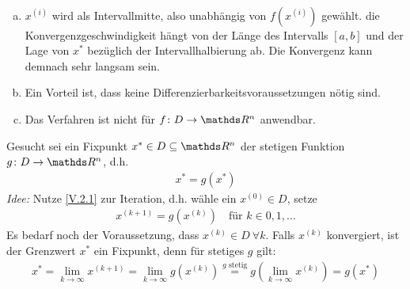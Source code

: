 \begin{Beme}~
  \begin{enumerate}[a)]
  \item $x^{(i)} $ wird als Intervallmitte, also unabhängig von $f(x^{(i)})$
    gewählt. die Konvergenzgeschwindigkeit hängt 
    von der Länge des Intervalls $[a,b]$
    und der Lage von $x^{*}$ bezüglich der Intervallhalbierung ab.
    Die Konvergenz kann demnach sehr langsam sein.
  \item Ein Vorteil ist, dass keine Differenzierbarkeitsvoraussetzungen nötig sind.
  \item Das Verfahren ist nicht für $f\colon D\to \R^n$ anwendbar.
  \end{enumerate}
\end{Beme}

Gesucht sei ein Fixpunkt $x^{*}\in D\subseteq \R^n$ der stetigen Funktion
$g\colon D\to\R^n$, d.h.
\begin{gather}
  x^{*} = g(x^{*}) \label{V.2.1}
\end{gather}
\textit{Idee:}
Nutze \eqref{V.2.1} zur Iteration, d.h. wähle ein $x^{(0)}\in D$, setze 
\begin{gather}
  x^{(k+1)} = g(x^{(k)})  \quad \text{für } k\in 0, 1, \dotsc
  \label{V.2.2}
\end{gather}
Es bedarf noch der Voraussetzung, dass $x^{(k)}\in D~ \forall k$.
Falls $x^{(k)}$ konvergiert, ist der Grenzwert $x^{*}$ ein Fixpunkt,
denn für stetiges $g$ gilt:
\begin{gather}
  x^{*} = \lim_{k\to \infty}x^{(k+1)} 
  = \lim_{k\to \infty}g(x^{(k)})
  \overset{g \text{ stetig}}{=} g(\lim_{k\to\infty}x^{(k)}) 
  = g(x^{*})
  \label{V.2.3}
\end{gather}



